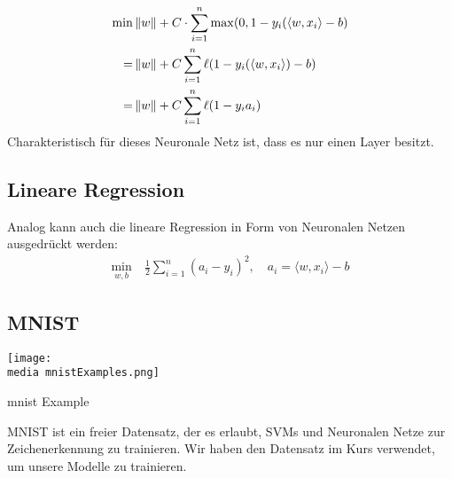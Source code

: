 \begin{align*}
\min &\left\lVert w\right\rVert + C \cdot \sum_{i=1}^{n} \max (0, 1-y_i (\langle w,x_i\rangle-b) \\
 = &\left\lVert w\right\rVert + C \sum_{i=1}^{n} \ell ( 1-y_i (\langle w,x_i\rangle)-b) \\
=&\left\lVert w\right\rVert + C \sum_{i=1}^{n} \ell (1 - y_i a_i)
\end{align*}
Charakteristisch für dieses Neuronale Netz ist, dass es nur einen Layer besitzt.

\subsection{Lineare Regression}

Analog kann auch die lineare Regression in Form von Neuronalen Netzen ausgedrückt werden:
\begin{align*}
\min\limits_{w,b} \ & \frac{1} {2} \sum_{i=1}^{n} (a_i -y_i)^2, \quad a_i = \langle w,x_i\rangle -b
\end{align*}

\subsection{MNIST}

\begin{dsafigure}
	\begin{center}
		\texttt{[image: \\media mnistExamples.png]}
		\caption{mnist Example }
		\label{FigConvNN}
	\end{center}
\end{dsafigure}

MNIST ist ein freier Datensatz, der es erlaubt, SVMs und Neuronalen Netze zur Zeichenerkennung zu trainieren. Wir haben den Datensatz im Kurs verwendet, um unsere Modelle zu trainieren.



